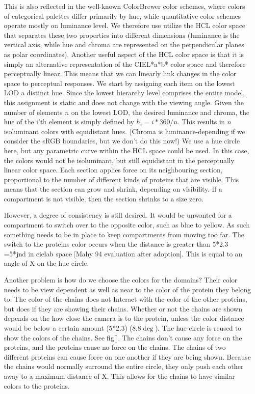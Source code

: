 \documentclass[review,journal]{vgtc}         %
\begin{document}
This is also reflected in the well-known ColorBrewer color schemes, where colors of categorical palettes differ primarily by hue, while quantitative color schemes operate mostly on luminance level.  
We therefore use utilize the HCL color space that separates these two properties into different dimensions (luminance is the vertical axis, while hue and chroma are represented on the perpendicular planes as polar coordinates). 
Another useful aspect of the HCL color space is that it is simply an alternative representation of the CIEL*a*b* color space and therefore perceptually linear. 
This means that we can linearly link changes in the color space to perceptual responses. 
We start by assigning each item on the lowest LOD a distinct hue. 
Since the lowest hierarchy level comprises the entire model, this assignment is static and does not change with the viewing angle. 
Given the number of elements $n$ on the lowest LOD, the desired luminance and chroma, the hue of the i’th element is simply defined by $h_i=i*360/n$. 
This results in $n$ isoluminant colors with equidistant hues. 
(Chroma is luminance-depending if we consider the sRGB boundaries, but we don’t do this now!)
We use a hue circle here, but any parametric curve within the HCL space could be used. 
In this case, the colors would not be isoluminant, but still equidistant in the perceptually linear color space. 
Each section applies force on its neighbouring section, proportional to the number of different kinds of proteins that are visible. 
This means that the section can grow and shrink, depending on visibility. If a compartment is not visible, then the section shrinks to a size zero. 

However, a degree of consistency is still desired. It would be unwanted for a compartment to switch over to the opposite color, such as blue to yellow.  
As such something needs to be in place to keep compartments from moving too far.
The switch to the proteins color occurs when the distance is greater than 5*2.3 =5*jnd in cielab space [Mahy 94 evaluation after adoption]. 
This is equal to an angle of X on the hue circle.

Another problem is how do we choose the colors for the domains? Their color needs to be view dependent as well as near to the color of the protein they belong to. 
The color of the chains does not Interact with the color of the other proteins, but does if they are showing their chains. 
Whether or not the chains are shown depends on the how close the camera is to the protein, unless the color distance would be below a certain amount (5*2.3) ($8.8\deg$). 
The hue circle is reused to show the colors of the chains. See fig[]. 
The chains don’t cause any force on the proteins, and the proteins cause no force on the chains. 
The chains of two different proteins can cause force on one another if they are being shown. 
Because the chains would normally surround the entire circle, they only push each other away to a maximum distance of X. 
This allows for the chains to have similar colors to the proteins.
\end{document}
